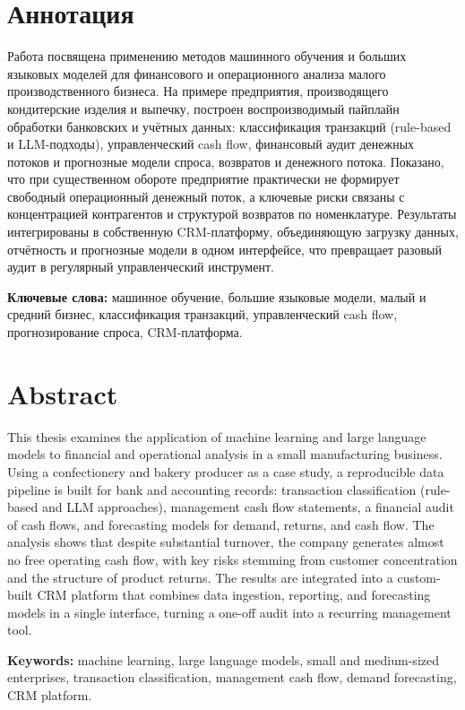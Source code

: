 \chapter*{Аннотация}

Работа посвящена применению методов машинного обучения и больших языковых моделей для финансового и операционного анализа малого производственного бизнеса. На примере предприятия, производящего кондитерские изделия и выпечку, построен воспроизводимый пайплайн обработки банковских и учётных данных: классификация транзакций (rule-based и LLM-подходы), управленческий cash flow, финансовый аудит денежных потоков и прогнозные модели спроса, возвратов и денежного потока. Показано, что при существенном обороте предприятие практически не формирует свободный операционный денежный поток, а ключевые риски связаны с концентрацией контрагентов и структурой возвратов по номенклатуре. Результаты интегрированы в собственную CRM-платформу, объединяющую загрузку данных, отчётность и прогнозные модели в одном интерфейсе, что превращает разовый аудит в регулярный управленческий инструмент.

\textbf{Ключевые слова:} машинное обучение, большие языковые модели, малый и средний бизнес, классификация транзакций, управленческий cash flow, прогнозирование спроса, CRM-платформа.

\chapter*{Abstract}

This thesis examines the application of machine learning and large language models to financial and operational analysis in a small manufacturing business. Using a confectionery and bakery producer as a case study, a reproducible data pipeline is built for bank and accounting records: transaction classification (rule-based and LLM approaches), management cash flow statements, a financial audit of cash flows, and forecasting models for demand, returns, and cash flow. The analysis shows that despite substantial turnover, the company generates almost no free operating cash flow, with key risks stemming from customer concentration and the structure of product returns. The results are integrated into a custom-built CRM platform that combines data ingestion, reporting, and forecasting models in a single interface, turning a one-off audit into a recurring management tool.

\textbf{Keywords:} machine learning, large language models, small and medium-sized enterprises, transaction classification, management cash flow, demand forecasting, CRM platform.

\clearpage
